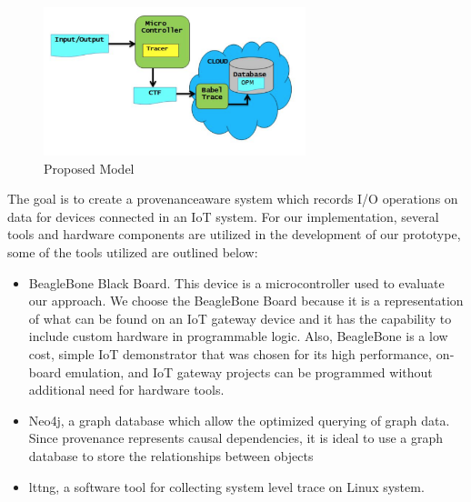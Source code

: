 \begin{figure}[h]
\begin{center}

\includegraphics[width =3.0in]{architecture.PNG}    
\end{center}
\caption{Proposed Model}
\label{architecture}
\end{figure}

The goal is to create a provenance\-aware system which records I/O operations on data for devices connected in an IoT system. For our implementation, several tools and hardware components are utilized in the development of our prototype, some of the tools utilized are outlined below:

\begin{itemize}
\item BeagleBone Black Board. This device is a microcontroller used to evaluate our approach. We choose the BeagleBone Board because it is a representation of what can be found on an IoT gateway device and it has the capability to include custom hardware in programmable logic. Also, BeagleBone is a low cost, simple IoT demonstrator that was chosen for its high performance, on­board emulation, and IoT gateway projects can be programmed without additional need for hardware tools.


\item Neo4j, a graph database which allow the optimized querying of graph data. Since provenance represents causal dependencies, it is ideal to use a graph database to store the relationships between objects

\item lttng, a software tool for collecting system level trace on Linux system. 

\end{itemize}


